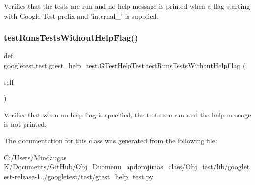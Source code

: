 \begin{DoxyVerb}Verifies that the tests are run and no help message is printed when
a flag starting with Google Test prefix and 'internal_' is supplied.\end{DoxyVerb}
 \mbox{\label{classgoogletest_1_1test_1_1gtest__help__test_1_1_g_test_help_test_a41b1c98c64d8e21c88294bfa4df680dc}} 
\subsubsection{\texorpdfstring{testRunsTestsWithoutHelpFlag()}{testRunsTestsWithoutHelpFlag()}}
{\footnotesize\ttfamily def googletest.\+test.\+gtest\+\_\+help\+\_\+test.\+G\+Test\+Help\+Test.\+test\+Runs\+Tests\+Without\+Help\+Flag (\begin{DoxyParamCaption}\item[{}]{self }\end{DoxyParamCaption})}

\begin{DoxyVerb}Verifies that when no help flag is specified, the tests are run
and the help message is not printed.\end{DoxyVerb}
 

The documentation for this class was generated from the following file\+:\begin{DoxyCompactItemize}
\item 
C\+:/\+Users/\+Mindaugas K/\+Documents/\+Git\+Hub/\+Obj\+\_\+\+Duomenu\+\_\+apdorojimas\+\_\+class/\+Obj\+\_\+test/lib/googletest-\/release-\/1../googletest/test/\mbox{\hyperlink{_obj__test_2lib_2googletest-release-1_88_81_2googletest_2test_2gtest__help__test_8py}{gtest\+\_\+help\+\_\+test.\+py}}\end{DoxyCompactItemize}
